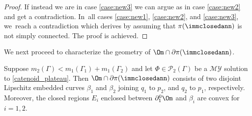 \begin{proof}
If instead we are in case \ref{case:new3} we can argue as in case \ref{case:new2} and get a contradiction. In~all cases \ref{case:new1}, \ref{case:new2}, and \ref{case:new3}, we~reach a contradiction which derives by assuming that $\pi(\immclosedann)$ is not simply connected. The proof is achieved.
\end{proof}

We next proceed to characterize the geometry of $\Om\cap\partial
\pi(\immclosedann)$.

\begin{lemma}
\label{lem:trace_on_the_horizontal_plane}
Suppose $m_2(\Gamma)<m_1(\Gamma_1)+m_1(\Gamma_2)$ and let
$\Phi\in\mathcal{P}_2(\Gamma)$ be a $\mathcal{MY}$ solution to \eqref{catenoid_plateau}.
Then $\Om\cap\partial \pi(\immclosedann)$
consists of two disjoint Lipschitz
embedded curves $\beta_1$ and $\beta_2$ joining $q_1$ to $p_2$, and $q_2$ to $p_1$, respectively.
Moreover, the closed regions $E_i$
enclosed between $\partial^0_1\Om$ and $\beta_i$
are convex for $i=1,2$.
\end{lemma}

